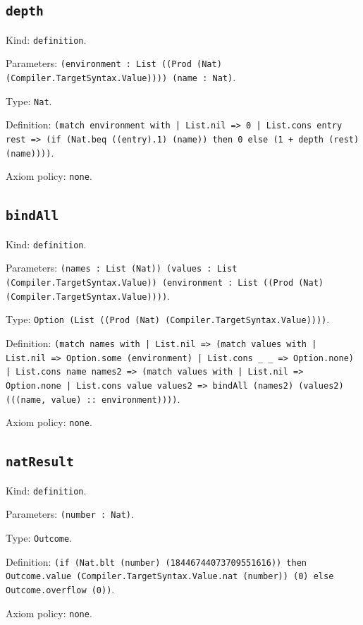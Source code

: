 \documentclass[11pt]{article}
\begin{document}
\subsection*{\texttt{depth}}
\noindent Kind: \texttt{definition}.\par
\noindent Parameters: \texttt{(environment : List ((Prod (Nat) (Compiler.TargetSyntax.Value)))) (name : Nat)}.\par
\noindent Type: \texttt{Nat}.\par
\noindent Definition: \texttt{(match environment with | List.nil => 0 | List.cons entry rest => (if (Nat.beq ((entry).1) (name)) then 0 else (1 + depth (rest) (name))))}.\par
\noindent Axiom policy: \texttt{none}.\par
\subsection*{\texttt{bindAll}}
\noindent Kind: \texttt{definition}.\par
\noindent Parameters: \texttt{(names : List (Nat)) (values : List (Compiler.TargetSyntax.Value)) (environment : List ((Prod (Nat) (Compiler.TargetSyntax.Value))))}.\par
\noindent Type: \texttt{Option (List ((Prod (Nat) (Compiler.TargetSyntax.Value))))}.\par
\noindent Definition: \texttt{(match names with | List.nil => (match values with | List.nil => Option.some (environment) | List.cons \_ \_ => Option.none) | List.cons name names2 => (match values with | List.nil => Option.none | List.cons value values2 => bindAll (names2) (values2) (((name, value) :: environment))))}.\par
\noindent Axiom policy: \texttt{none}.\par
\subsection*{\texttt{natResult}}
\noindent Kind: \texttt{definition}.\par
\noindent Parameters: \texttt{(number : Nat)}.\par
\noindent Type: \texttt{Outcome}.\par
\noindent Definition: \texttt{(if (Nat.blt (number) (18446744073709551616)) then Outcome.value (Compiler.TargetSyntax.Value.nat (number)) (0) else Outcome.overflow (0))}.\par
\noindent Axiom policy: \texttt{none}.\par
\end{document}
